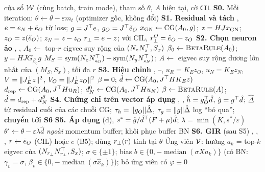 \begin{algorithm}[p]
\caption{VNA--GIR (một lần áp dụng, mỗi $K$ iteration; giữa các lần áp dụng, optimizer gốc chạy bình thường)}\label{alg:vna}
\small
\begin{algorithmic}[1]
\Require cửa sổ $\mathcal{W}$ (cùng batch, train mode), tham số $\theta$, $A$ hiện tại, cờ \texttt{CIL}
\Statex \textbf{S0.} Mỗi iteration: $\theta\leftarrow\theta-\varepsilon m_t$ (optimizer gốc, không đổi)
\Statex \textbf{S1. Residual và tách} \hfill{}, 
\State $e=e_N+\tilde e_O$ từ loss; $g=J^{\top} e$, $g_O=J^{\top}\tilde e_O$ 
\State $x_{\mathrm{GN}}\leftarrow\mathrm{CG}(A_0,g)$; $z=HJx_{\mathrm{GN}}$; $z_O=z(\tilde e_O)$; $z_N=z-z_O$ 
\State $r_{\perp}=e-z$; với CIL, $r_{\perp}^O=\tilde e_O-z_O$ 
\Statex \textbf{S2. Chọn neuron ảo} \hfill{}, , 
  \State $A_0\leftarrow$ top-$r$ eigvec suy rộng của $(N_zN_z^{\top},S_x)$ 
  \State $\beta_0\leftarrow\textsc{BetaRule}(A_0)$; $y=HJG_{\beta_0}g$ 
  \State $M_S=\operatorname{sym}(N_zN_{z_O}^{\top})+\operatorname{sym}(N_yN_{z_N}^{\top})$; $A\leftarrow$ eigvec suy rộng dương lớn nhất của $(M_S,S_x)$, tối đa $r$
\EndIf
\Statex \textbf{S3. Hiệu chỉnh} \hfill{}, --, 
\State $u_R=K_Ez_O$, $u_N=K_Ez_N$, $V=\lVert J_E^{\top} z\rVert^2$, $V_O=\lVert J_E^{\top} z_O\rVert^2$
 \State $\beta=0$; $\hat d\leftarrow\mathrm{CG}(A_0,J^{\top} HK_Ez)$ 
\Else
  \State $d_{\mathrm{rep}}\leftarrow\mathrm{CG}(A_0,J^{\top} Hu_R)$; $d_N^0\leftarrow\mathrm{CG}(A_0,J^{\top} Hu_N)$ 
  \State $\beta\leftarrow\textsc{BetaRule}(A)$; $\hat d=d_{\mathrm{rep}}+d_N^{\beta}$
\EndIf
\Statex \textbf{S4. Chứng chỉ trên vector áp dụng} \hfill{}, , 
\State $\hat h=g_O^{\top}\hat d$, $\hat g=g^{\top}\hat d$; $\hat\Delta$ từ residual cuối của các chuỗi CG; $\tau_h=\lVert g_O\rVert\hat\Delta$, $\tau_g=\lVert g\rVert\hat\Delta$
 \State log ``bỏ qua''; \textbf{chuyển tới S6}
\EndIf
\Statex \textbf{S5. Áp dụng} \hfill{}(d), 
\State $s^*=\hat g/\hat d^{\top}(F+\mu)\hat d$; $\lambda=\min(K,s^*/\varepsilon)$ 
\State $\theta'\leftarrow\theta-\varepsilon\lambda\hat d$ \emph{ngoài} momentum buffer; khôi phục buffer BN
\Statex \textbf{S6. GIR} (sau S5) \hfill{}, , , 
\State $r\leftarrow\tilde e_O$ (CIL) hoặc $e$ (B5); dùng $r_{\perp}(r)$ tính tại $\theta$
\State Ứng viên $\mathcal{V}$: hướng $a_k$ = top-$k$ eigvec của $(N_{r_{\perp}}N_{r_{\perp}}^{\top},S_x)$; $\sigma\in\{\pm1\}$; bias $b\in\{0,-\operatorname{median}(\sigma Xa_k)\}$ (có BN: $\gamma_v=\sigma$, $\beta_v\in\{0,-\operatorname{median}(\sigma\hat x_k)\}$); bỏ ứng viên có $\varphi\equiv0$

\end{algorithmic}
\end{algorithm}
